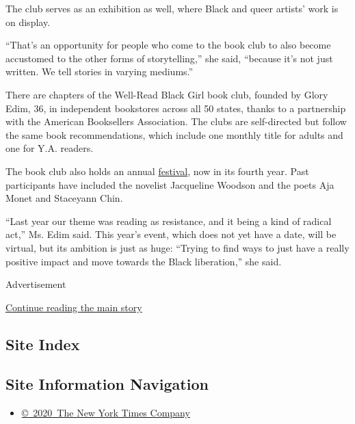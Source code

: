 The club serves as an exhibition as well, where Black and queer artists'
work is on display.

``That's an opportunity for people who come to the book club to also
become accustomed to the other forms of storytelling,'' she said,
``because it's not just written. We tell stories in varying mediums.''

There are chapters of the Well-Read Black Girl book club, founded by
Glory Edim, 36, in independent bookstores across all 50 states, thanks
to a partnership with the American Booksellers Association. The clubs
are self-directed but follow the same book recommendations, which
include one monthly title for adults and one for Y.A. readers.

The book club also holds an annual
\href{https://www.wellreadblackgirl.org/}{festival}, now in its fourth
year. Past participants have included the novelist Jacqueline Woodson
and the poets Aja Monet and Staceyann Chin.

``Last year our theme was reading as resistance, and it being a kind of
radical act,'' Ms. Edim said. This year's event, which does not yet have
a date, will be virtual, but its ambition is just as huge: ``Trying to
find ways to just have a really positive impact and move towards the
Black liberation,'' she said.

Advertisement

\protect\hyperlink{after-bottom}{Continue reading the main story}

\hypertarget{site-index}{%
\subsection{Site Index}\label{site-index}}

\hypertarget{site-information-navigation}{%
\subsection{Site Information
Navigation}\label{site-information-navigation}}

\begin{itemize}
\tightlist
\item
  \href{https://help.nytimes3xbfgragh.onion/hc/en-us/articles/115014792127-Copyright-notice}{©~2020~The
  New York Times Company}
\end{itemize}

